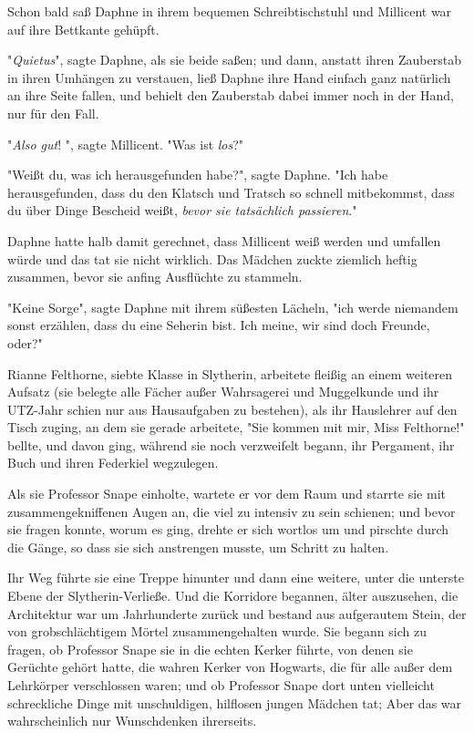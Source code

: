 {Schon bald saß Daphne in ihrem bequemen Schreibtischstuhl und Millicent war auf ihre Bettkante gehüpft.

"\emph{Quietus}", sagte Daphne, als sie beide saßen; und dann, anstatt ihren Zauberstab in ihren Umhängen zu verstauen, ließ Daphne ihre Hand einfach ganz natürlich an ihre Seite fallen, und behielt den Zauberstab dabei immer noch in der Hand, nur für den Fall.

"\emph{Also gut}! ", sagte Millicent. "Was ist \emph{los}?"

"Weißt du, was ich herausgefunden habe?", sagte Daphne. "Ich habe herausgefunden, dass du den Klatsch und Tratsch so schnell mitbekommst, dass du über Dinge Bescheid weißt, \emph{bevor sie tatsächlich passieren}."

Daphne hatte halb damit gerechnet, dass Millicent weiß werden und umfallen würde und das tat sie nicht wirklich. Das Mädchen zuckte ziemlich heftig zusammen, bevor sie anfing Ausflüchte zu stammeln.

"Keine Sorge", sagte Daphne mit ihrem süßesten Lächeln, "ich werde niemandem sonst erzählen, dass du eine Seherin bist. Ich meine, wir sind doch Freunde, oder?"

Rianne Felthorne, siebte Klasse in Slytherin, arbeitete fleißig an einem weiteren Aufsatz (sie belegte alle Fächer außer Wahrsagerei und Muggelkunde und ihr UTZ-Jahr schien nur aus Hausaufgaben zu bestehen), als ihr Hauslehrer auf den Tisch zuging, an dem sie gerade arbeitete, "Sie kommen mit mir, Miss Felthorne!" bellte, und davon ging, während sie noch verzweifelt begann, ihr Pergament, ihr Buch und ihren Federkiel wegzulegen.

Als sie Professor Snape einholte, wartete er vor dem Raum und starrte sie mit zusammengekniffenen Augen an, die viel zu intensiv zu sein schienen; und bevor sie fragen konnte, worum es ging, drehte er sich wortlos um und pirschte durch die Gänge, so dass sie sich anstrengen musste, um Schritt zu halten.

Ihr Weg führte sie eine Treppe hinunter und dann eine weitere, unter die unterste Ebene der Slytherin-Verließe. Und die Korridore begannen, älter auszusehen, die Architektur war um Jahrhunderte zurück und bestand aus aufgerautem Stein, der von grobschlächtigem Mörtel zusammengehalten wurde. Sie begann sich zu fragen, ob Professor Snape sie in die echten Kerker führte, von denen sie Gerüchte gehört hatte, die wahren Kerker von Hogwarts, die für alle außer dem Lehrkörper verschlossen waren; und ob Professor Snape dort unten vielleicht schreckliche Dinge mit unschuldigen, hilflosen jungen Mädchen tat; Aber das war wahrscheinlich nur Wunschdenken ihrerseits.

}
